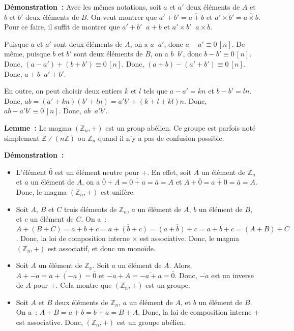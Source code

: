 \medskip

\noindent\textbf{Démonstration :} Avec les mêmes notations, soit $a$ et $a'$ deux éléments de $A$ et $b$ et $b'$ deux éléments de $B$.
    On veut montrer que $\overline{a' + b'} = \overline{a + b}$ et $\overline{a' \times b'} = \overline{a \times b}$.
    Pour ce faire, il suffit de montrer que $a' + b' \mathop{R_n} a + b$ et $a' \times b' \mathop{R_n} a \times b$.

    Puisque $a$ et $a'$ sont deux éléments de $A$, on a $a \mathop{R_n} a'$, donc $a - a' \equiv 0 \, [n]$.
    De même, puisque $b$ et $b'$ sont deux éléments de $B$, on a $b \mathop{R_n} b'$, donc $b - b' \equiv 0 \, [n]$.
    Donc, $(a - a') + (b + b') \equiv 0 \, [n]$. 
    Donc, $(a + b) - (a' + b') \equiv 0 \, [n]$.
    Donc, $a + b \mathop{R_n} a' + b'$.

    En outre, on peut choisir deux entiers $k$ et $l$ tels que $a - a' = k n$ et $b - b' = l n$.
    Donc, $a b = (a' + k n) (b' + l n) = a' b' + (k + l + k l) n$.
    Donc, $a b - a' b' \equiv 0 \, [n]$.
    Donc, $a b \mathop{R_n} a' b'$.

    \done

\medskip

\noindent\textbf{Lemme :} Le magma $\left( \mathbb{Z}_n, + \right)$ est un group abélien. 
    Ce groupe est parfois noté simplement $\mathbb{Z} \divslash (n \mathbb{Z})$ ou $\mathbb{Z}_n$ quand il n'y a pas de confusion possible.

\medskip

\noindent\textbf{Démonstration :} 
\begin{itemize}[nosep]
    \item L'élément $\bar{0}$ est un élément neutre pour $+$.
        En effet, soit $A$ un élément de $\mathbb{Z}_n$ et $a$ un élément de $A$, on a $\bar{0} + A = \overline{0+a} = \bar{a} = A$ et $A + \bar{0} = \overline{a+0} = \bar{a} = A$.
        Donc, le magma $\left( \mathbb{Z}_n, + \right)$ est unifère.
    \item Soit $A$, $B$ et $C$ trois éléments de $\mathbb{Z}_n$, $a$ un élément de $A$, $b$ un élément de $B$, et $c$ un élément de $C$.
        On a : $A + (B + C) = \bar{a} + \overline{b+c} = \overline{a+(b+c)} = \overline{(a+b)+c} = \overline{a+b} + \bar{c} = (A + B) + C$.
        Donc, la loi de composition interne $\times$ est associative.
        Donc, le magma $\left( \mathbb{Z}_n, + \right)$ est associatif, et donc un monoïde.
    \item Soit $A$ un élément de $\mathbb{Z_n}$. 
        Soit $a$ un élément de $A$.
        Alors, $A + \overline{-a} = \overline{a+(-a)} = \bar{0}$ et $\overline{-a} + A = \overline{-a+a} = \bar{0}$.
        Donc, $\overline{-a}$ est un inverse de $A$ pour $+$.
        Cela montre que $\left( \mathbb{Z}_n, + \right)$ est un groupe.
    \item Soit $A$ et $B$ deux éléments de $\mathbb{Z}_n$, $a$ un élément de $A$, et $b$ un élément de $B$. 
        On a : $A + B = \overline{a+b} = \overline{b+a} = B + A$.
        Donc, la loi de composition interne $+$ est associative.
        Donc, $\left( \mathbb{Z}_n, + \right)$ est un groupe abélien.
\end{itemize}

